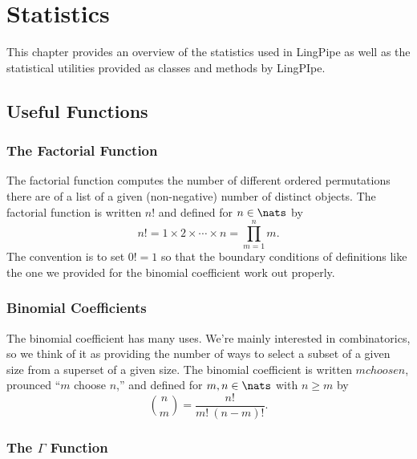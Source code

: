 \chapter{Statistics}\label{chapter:stats}

This chapter provides an overview of the statistics used
in LingPipe as well as the statistical utilities provided
as classes and methods by LingPIpe.  

\section{Useful Functions}


\subsection{The Factorial Function}\label{section:stats-factorial}

The factorial function computes the number of different ordered
permutations there are of a list of a given (non-negative) number of
distinct objects.  The factorial function is written $n!$
and defined for $n \in \nats$ by
%
\begin{equation}
n! = 1 \times 2 \times \cdots \times n = \prod_{m=1}^n m.
\end{equation}
%
The convention is to set $0! = 1$ so that the boundary conditions of
definitions like the one we provided for the binomial coefficient work
out properly.


\subsection{Binomial Coefficients}\label{section:stats-binomial-coefficient}

The binomial coefficient has many uses.  We're mainly interested in
combinatorics, so we think of it as providing the number of ways to
select a subset of a given size from a superset of a given size.  The
binomial coefficient is written ${m choose n}$, prounced ``$m$
choose $n$,'' and defined for $m, n \in \nats$ with $n \geq m$ by
%
\begin{equation}
{n \choose m} = \frac{n!}{m! \ (n-m)!}.
\end{equation}


\subsection{The $\Gamma$ Function}\label{section:stats-gamma-function}

